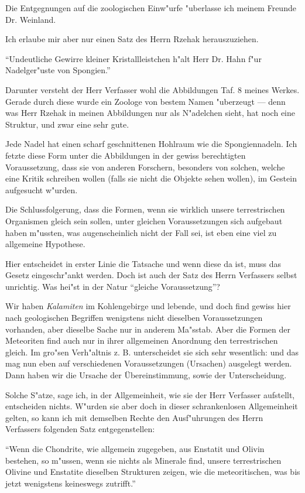 \documentclass[a4paper, 12pt, oneside]{article}
\begin{document}
Die Entgegnungen auf die zoologischen Einw"urfe "uberlasse ich meinem Freunde Dr. Weinland.

Ich erlaube mir aber nur einen Satz des Herrn Rzehak herauszuziehen.

"`Undeutliche Gewirre kleiner Kristallleistchen h"alt Herr Dr. Hahn f"ur Nadelger"uste von Spongien."'

Darunter versteht der Herr Verfasser wohl die Abbildungen Taf. 8 meines Werkes. Gerade durch diese wurde ein Zoologe von bestem Namen "uberzeugt --- denn was Herr Rzehak in meinen Abbildungen nur als N"adelchen sieht, hat noch eine Struktur, und zwar eine sehr gute.

Jede Nadel hat einen scharf geschnittenen Hohlraum wie die Spongiennadeln. Ich fetzte diese Form unter die Abbildungen in der gewiss berechtigten Voraussetzung, dass sie von anderen Forschern, besonders von solchen, welche eine Kritik schreiben wollen (falls sie nicht die Objekte sehen wollen), im Gestein aufgesucht w"urden.

Die Schlussfolgerung, dass die Formen, wenn sie wirklich unsere terrestrischen Organismen gleich sein sollen, unter gleichen Voraussetzungen sich aufgebaut haben m"ussten, was augenscheinlich nicht der Fall sei, ist eben eine viel zu allgemeine Hypothese.

Hier entscheidet in erster Linie die Tatsache und wenn diese da ist, muss das Gesetz eingeschr"ankt werden. Doch ist auch der Satz des Herrn Verfassers selbst unrichtig. Was hei"st in der Natur "`gleiche Voraussetzung"'?

Wir haben \emph{Kalamiten} im Kohlengebirge und lebende, und doch find gewiss hier nach geologischen Begriffen wenigstens nicht dieselben Voraussetzungen vorhanden, aber dieselbe Sache nur in anderem Ma"sstab. Aber die Formen der Meteoriten find auch nur in ihrer allgemeinen Anordnung den terrestrischen gleich. Im gro"sen Verh"altnis z. B. unterscheidet sie sich sehr wesentlich: und das mag nun eben auf verschiedenen Voraussetzungen (Ursachen) ausgelegt werden. Dann haben wir die Ursache der Übereinstimmung, sowie der Unterscheidung.

Solche S"atze, sage ich, in der Allgemeinheit, wie sie der Herr Verfasser aufstellt, entscheiden nichts. W"urden sie aber doch in dieser schrankenlosen Allgemeinheit gelten, so kann ich mit demselben Rechte den Ausf"uhrungen des Herrn Verfassers folgenden Satz entgegenstellen:

"`Wenn die Chondrite, wie allgemein zugegeben, aus Enstatit und Olivin bestehen, so m"ussen, wenn sie nichts als Minerale find, unsere terrestrischen Olivine und Enstatite dieselben Strukturen zeigen, wie die meteoritischen, was bis jetzt wenigstens keineswegs zutrifft."'
\end{document}
